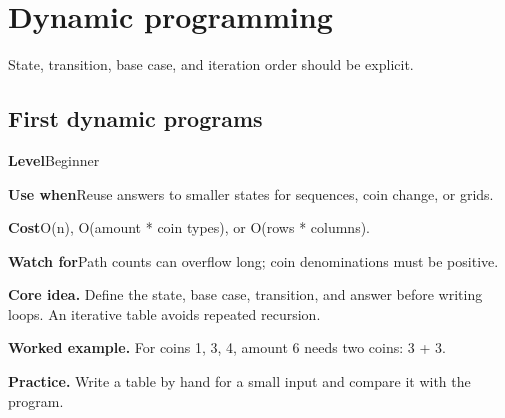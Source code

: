 \documentclass[10pt,letterpaper]{article}
\newcommand{\entrylabel}[1]{\textcolor{accent}{\bfseries #1}}
\begin{document}
\section{Dynamic programming}
\begin{guidebox}State, transition, base case, and iteration order should be explicit.\end{guidebox}
\subsection{First dynamic programs}
\begin{guidebox}\small
\entrylabel{Level}\quad Beginner\par
\entrylabel{Use when}\quad Reuse answers to smaller states for sequences, coin change, or grids.\par
\entrylabel{Cost}\quad O(n), O(amount * coin types), or O(rows * columns).\par
\entrylabel{Watch for}\quad Path counts can overflow long; coin denominations must be positive.\par
\end{guidebox}
\noindent\textbf{Core idea.} Define the state, base case, transition, and answer before writing loops. An iterative table avoids repeated recursion.\par
\noindent\textbf{Worked example.} For coins 1, 3, 4, amount 6 needs two coins: 3 + 3.\par
\noindent\textbf{Practice.} Write a table by hand for a small input and compare it with the program.\par
\end{document}
